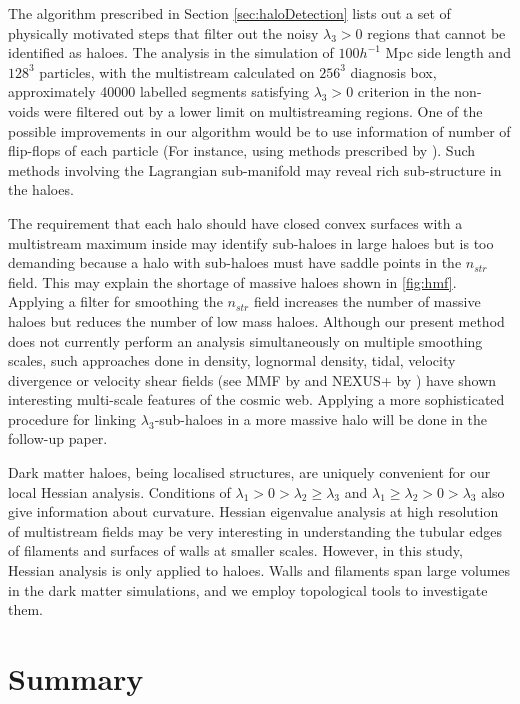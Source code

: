 \documentclass[fleqn,usenatbib,useAMS]{mnras}
\begin{document}
The algorithm prescribed in Section \ref{sec:haloDetection} lists out a set of physically motivated steps that filter out the noisy $\lambda_3 > 0$ regions that cannot be identified as haloes. The analysis in the simulation of $100 h^{-1}$ Mpc side length and $128^3$ particles, with the multistream calculated on $256^3$ diagnosis box, approximately 40000 labelled segments satisfying $\lambda_3 > 0$ criterion in the non-voids were filtered out by a lower limit on multistreaming regions. One of the possible improvements in our algorithm would be to use information of number of flip-flops of each particle (For instance, using methods prescribed by \citealt{Shandarin2014,Shandarin2016}). Such methods involving the Lagrangian sub-manifold may reveal rich sub-structure in the haloes. 

 
The requirement that each halo should have closed convex surfaces with a multistream maximum inside may identify sub-haloes in large haloes but is too demanding because a halo with sub-haloes must have saddle points in the $n_{str}$ field. This may explain the shortage of massive haloes shown in \autoref{fig:hmf}. Applying a filter for smoothing the $n_{str}$ field increases the number of massive haloes but reduces the number of low mass haloes. Although our present method does not currently perform an analysis simultaneously on multiple smoothing scales, such approaches done in density, lognormal density, tidal, velocity divergence or velocity shear fields (see MMF by \citealt{Aragon-Calvo2007} and NEXUS+ by \citealt{Cautun2013}) have shown interesting multi-scale features of the cosmic web. Applying a more sophisticated procedure for linking $\lambda_3$-sub-haloes in a more massive halo will be done in the follow-up paper.  


Dark matter haloes, being localised structures, are uniquely convenient for our local Hessian analysis. Conditions of $\lambda_1 > 0 > \lambda_2 \geq \lambda_3 $ and $\lambda_1 \geq \lambda_2 > 0 > \lambda_3 $ also give information about curvature. Hessian eigenvalue analysis at high resolution of multistream fields may be very interesting in understanding the tubular edges of filaments and surfaces of walls at smaller scales. However, in this study, Hessian analysis is only applied to haloes. Walls and filaments span large volumes in the dark matter simulations, and we employ topological tools to investigate them. 


\section{Summary}
\label{sec:summary}
\end{document}
